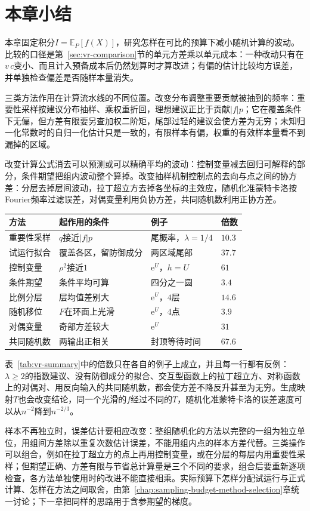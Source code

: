 \section{本章小结}
\label{sec:vr-summary}

本章固定积分$I=\mathbb{E}_P[f(X)]$，研究怎样在可比的预算下减小随机计算的波动。比较的口径是第~\ref{sec:vr-comparison}节的单元方差乘以单元成本：一种改动只有在$v\,c$变小、而且计入预备成本后仍然划算时才算改进；有偏的估计比较均方误差，并单独检查偏差是否随样本量消失。

三类方法作用在计算流水线的不同位置。改变分布调整重要贡献被抽到的频率：重要性采样按建议分布抽样、乘权重折回，理想建议正比于贡献$\lvert f\rvert p$；它在覆盖条件下无偏，但方差有限要另查加权二阶矩，尾部过轻的建议会使方差为无穷；未知归一化常数时的自归一化估计只是一致的，有限样本有偏，权重的有效样本量看不到漏掉的区域。

改变计算公式消去可以预测或可以精确平均的波动：控制变量减去回归可解释的部分，条件期望把组内波动整个算掉。改变抽样机制控制点的去向与点之间的协方差：分层去掉层间波动，拉丁超立方去掉各坐标的主效应，随机化准蒙特卡洛按Fourier频率过滤误差，对偶变量利用负协方差，共同随机数利用正协方差。

\begin{BookInlineTable}
 \centering
 \caption{本章方法在贯穿例子上的效果。单样本方差均折合到一次函数求值；“倍数”是独立抽样方差与之的比值，未计入额外成本。}
 \label{tab:vr-summary}
 \begin{tabular}{llll}
  \toprule
  方法 & 起作用的条件 & 例子 & 倍数\\
  \midrule
  重要性采样 & $q$接近$\lvert f\rvert p$ & 尾概率，$\lambda=1/4$ & $10.3$\\
  试运行拟合 & 覆盖各区，留防御成分 & 两区域尾部 & $37.7$\\
  控制变量 & $\rho^2$接近$1$ & $\mathrm{e}^{U}$，$h=U$ & $61$\\
  条件期望 & 条件平均可算 & 四分之一圆 & $3.4$\\
  比例分层 & 层均值差别大 & $\mathrm{e}^{U}$，$4$层 & $14.6$\\
  随机移位 & $F$在环面上光滑 & $\mathrm{e}^{U}$，$4$点 & $3.9$\\
  对偶变量 & 奇部方差较大 & $\mathrm{e}^{U}$ & $31$\\
  共同随机数 & 两输出正相关 & 封顶等待时间 & $67.6$\\
  \bottomrule
 \end{tabular}
\end{BookInlineTable}

表~\ref{tab:vr-summary}中的倍数只在各自的例子上成立，并且每一行都有反例：$\lambda\geq2$的指数建议、没有防御成分的拟合、交互型函数上的拉丁超立方、对称函数上的对偶对、用反向输入的共同随机数，都会使方差不降反升甚至为无穷。生成映射$T$也会改变结论，同一个光滑的$f$经过不同的$T$，随机化准蒙特卡洛的误差速度可以从$n^{-2}$降到$n^{-2/3}$。

样本不再独立时，误差估计要相应改变：整组随机化的方法以完整的一组为独立单位，用组间方差除以重复次数估计误差，不能用组内点的样本方差代替。三类操作可以组合，例如在拉丁超立方的点上再用控制变量，或在分层的每层内用重要性采样；但期望正确、方差有限与节省总计算量是三个不同的要求，组合后要重新逐项检查，各方法单独使用时的改进不能直接相乘。实际预算下怎样分配试运行与正式计算、怎样在方法之间取舍，由第~\ref{chap:sampling-budget-method-selection}章统一讨论；下一章把同样的思路用于含参期望的梯度。
